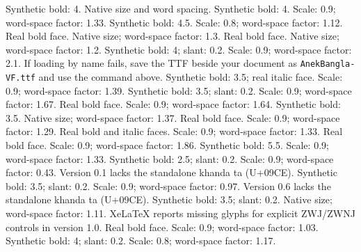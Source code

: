 \documentclass[11pt,a4paper]{article}
\begin{document}
\renewcommand{\contentsname}{Contents}
\tableofcontents
{}
  {Synthetic bold: 4. Native size and word spacing.}
  {Synthetic bold: 4. Scale: 0.9; word-space factor: 1.33.}
  {Synthetic bold: 4.5. Scale: 0.8; word-space factor: 1.12.}
  {Real bold face. Native size; word-space factor: 1.3.}
  {Real bold face. Native size; word-space factor: 1.2.}
  {Synthetic bold: 4; slant: 0.2.
   Scale: 0.9; word-space factor: 2.1.\newline
   If loading by name fails, save the TTF beside your document as
   \texttt{AnekBangla-VF.ttf} and use the command above.}
  {Synthetic bold: 3.5; real italic face. Scale: 0.9; word-space factor: 1.39.}
  {Synthetic bold: 3.5; slant: 0.2. Scale: 0.9; word-space factor: 1.67.}
  {Real bold face. Scale: 0.9; word-space factor: 1.64.}
  {Synthetic bold: 3.5. Native size; word-space factor: 1.37.}
\ifdefined\kohinoorfont
{}
  {Real bold face. Scale: 0.9; word-space factor: 1.29.}
\fi
{}
  {Real bold and italic faces. Scale: 0.9; word-space factor: 1.33.}
  {Real bold face. Scale: 0.9; word-space factor: 1.86.}
  {Synthetic bold: 5.5. Scale: 0.9; word-space factor: 1.33.}
  {Synthetic bold: 2.5; slant: 0.2. Scale: 0.9; word-space factor: 0.43.\newline
   Version 0.1 lacks the standalone khanda ta (U+09CE).}
  {Synthetic bold: 3.5; slant: 0.2. Scale: 0.9; word-space factor: 0.97.\newline
   Version 0.6 lacks the standalone khanda ta (U+09CE).}
  {Synthetic bold: 3.5; slant: 0.2. Native size; word-space factor: 1.11.\newline
   XeLaTeX reports missing glyphs for explicit ZWJ/ZWNJ controls in version 1.0.}
  {Real bold face. Scale: 0.9; word-space factor: 1.03.}
  {Synthetic bold: 4; slant: 0.2. Scale: 0.8; word-space factor: 1.17.}
\end{document}
